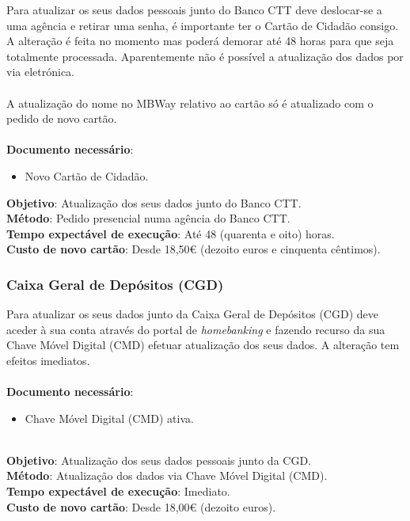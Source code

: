 Para atualizar os seus dados pessoais junto do Banco CTT deve
deslocar-se a uma agência e retirar uma senha, é importante ter o Cartão
de Cidadão consigo. A alteração é feita no momento mas poderá demorar
até 48 horas para que seja totalmente processada. Aparentemente não é
possível a atualização dos dados por via eletrónica. \\
\\
A atualização do nome no MBWay relativo ao cartão só é atualizado 
com o pedido de novo cartão. \\
\\
\textbf{Documento necessário}:
\begin{itemize}
	\item Novo Cartão de Cidadão.
\end{itemize}

\textbf{Objetivo}: Atualização dos seus dados junto do Banco CTT. \\
\textbf{Método}: Pedido presencial numa agência do Banco CTT. \\
\textbf{Tempo expectável de execução}: Até 48 (quarenta e oito) horas. \\
\textbf{Custo de novo cartão}: Desde 18,50€ (dezoito euros e cinquenta cêntimos). \\

\subsubsection{Caixa Geral de Depósitos (CGD)}

Para atualizar os seus dados junto da Caixa Geral de Depósitos (CGD)
deve aceder à sua conta através do portal de \emph{homebanking} e
fazendo recurso da sua Chave Móvel Digital (CMD) efetuar atualização dos
seus dados. A alteração tem efeitos imediatos. \\
\\
\textbf{Documento necessário}:
\begin{itemize}
	\item Chave Móvel Digital (CMD) ativa.
\end{itemize}
\leavevmode\\
\textbf{Objetivo}: Atualização dos seus dados pessoais junto da CGD. \\
\textbf{Método}: Atualização dos dados via Chave Móvel Digital (CMD). \\
\textbf{Tempo expectável de execução}: Imediato. \\
\textbf{Custo de novo cartão}: Desde 18,00€ (dezoito euros).

